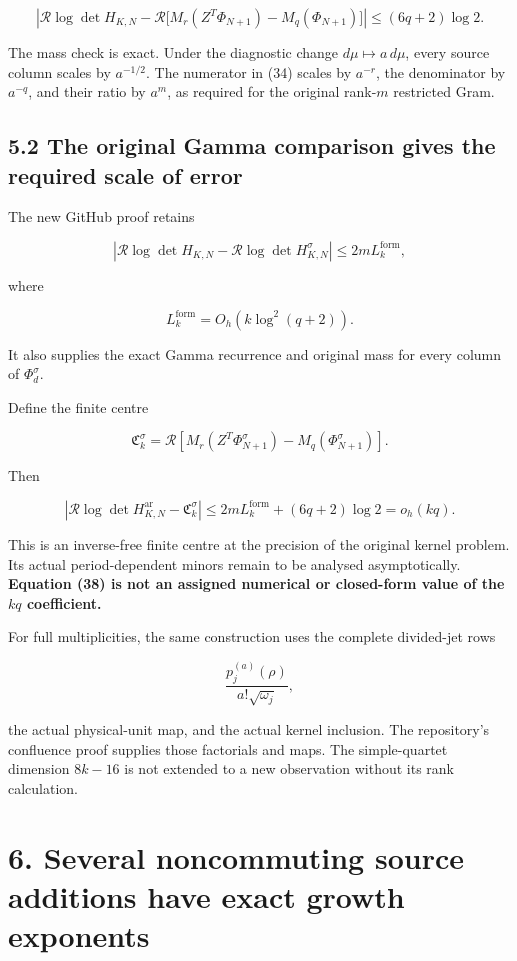 \documentclass[11pt]{article}
\begin{document}
\[
\boxed{
\left|
\mathcal R\log\det H_{K,N}
-
\mathcal R\bigl[M_r(Z^T\Phi_{N+1})-M_q(\Phi_{N+1})\bigr]
\right|
\le(6q+2)\log2.
}
\tag{37}
\]

The mass check is exact. Under the diagnostic change \(d\mu\mapsto a\,d\mu\), every source column scales by \(a^{-1/2}\). The numerator in (34) scales by \(a^{-r}\), the denominator by \(a^{-q}\), and their ratio by \(a^m\), as required for the original rank-\(m\) restricted Gram.

\subsection{5.2 The original Gamma comparison gives the required scale of error}\label{the-original-gamma-comparison-gives-the-required-scale-of-error}

The new GitHub proof retains

\[
\left|
\mathcal R\log\det H_{K,N}
-
\mathcal R\log\det H^\sigma_{K,N}
\right|
\le2mL_k^{\mathrm{form}},
\]

where

\[
L_k^{\mathrm{form}}=O_h(k\log^2(q+2)).
\]

It also supplies the exact Gamma recurrence and original mass for every column of \(\Phi_d^\sigma\).

Define the finite centre

\[
\mathfrak C_k^\sigma
=
\mathcal R\left[
M_r(Z^T\Phi_{N+1}^\sigma)
-M_q(\Phi_{N+1}^\sigma)
\right].
\]

Then

\[
\boxed{
\left|
\mathcal R\log\det H_{K,N}^{\mathrm{ar}}
-\mathfrak C_k^\sigma
\right|
\le
2mL_k^{\mathrm{form}}+(6q+2)\log2
=o_h(kq).
}
\tag{38}
\]

This is an inverse-free finite centre at the precision of the original kernel problem. Its actual period-dependent minors remain to be analysed asymptotically. \textbf{Equation (38) is not an assigned numerical or closed-form value of the \(kq\) coefficient.}

For full multiplicities, the same construction uses the complete divided-jet rows

\[
\frac{p_j^{(a)}(\rho)}{a!\sqrt{\omega_j}},
\]

the actual physical-unit map, and the actual kernel inclusion. The repository's confluence proof supplies those factorials and maps. The simple-quartet dimension \(8k-16\) is not extended to a new observation without its rank calculation.

\section{6. Several noncommuting source additions have exact growth exponents}\label{several-noncommuting-source-additions-have-exact-growth-exponents}
\end{document}

